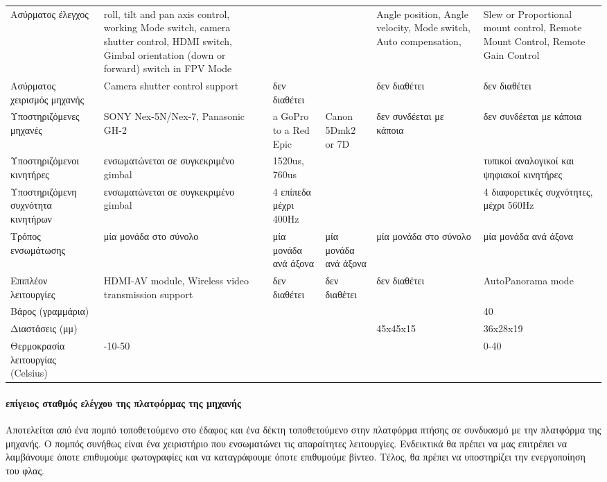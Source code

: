 \documentclass[a4paper, 12pt, twoside]{report}
\begin{document}
{{{{{{\begin{landscape}
\begin{longtable} { m{3cm} m{3cm} m{3cm} m{3cm} m{3cm} m{3cm} }
					\hdashline
					Ασύρματος έλεγχος & roll, tilt and pan axis control, working Mode switch, camera shutter control, HDMI switch, Gimbal orientation (down or forward) switch in FPV Mode & & & Angle position, Angle velocity, Mode switch, Auto compensation, & Slew or Proportional mount control, Remote Mount Control, Remote Gain Control\\
					\hdashline
					Ασύρματος χειρισμός μηχανής & Camera shutter control support & δεν διαθέτει & & δεν διαθέτει & δεν διαθέτει\\
					\hdashline
					Υποστηριζόμενες μηχανές & SONY Nex-5N/Nex-7, Panasonic GH-2 & a GoPro to a Red Epic & Canon 5Dmk2 or 7D & δεν συνδέεται με κάποια & δεν συνδέεται με κάποια\\
					\hdashline
					Υποστηριζόμενοι κινητήρες & ενσωματώνεται σε συγκεκριμένο gimbal & 1520us, 760us & & & τυπικοί αναλογικοί και ψηφιακοί κινητήρες\\
					Υποστηριζόμενη συχνότητα κινητήρων  & ενσωματώνεται σε συγκεκριμένο gimbal & 4 επίπεδα μέχρι 400Hz & & & 4 διαφορετικές συχνότητες, μέχρι 560Hz\\
					\hdashline
					Τρόπος ενσωμάτωσης & μία μονάδα στο σύνολο & μία μονάδα ανά άξονα & μία μονάδα ανά άξονα & μία μονάδα στο σύνολο & μία μονάδα ανά άξονα\\
					\hdashline
					Επιπλέον λειτουργίες & HDMI-AV module, Wireless video transmission support & δεν διαθέτει & δεν διαθέτει & δεν διαθέτει & AutoPanorama mode \\
					\hdashline
					Βάρος (γραμμάρια) & & & & & 40\\
					\hdashline
					Διαστάσεις (μμ) & & & & 45x45x15 & 36x28x19\\
					\hdashline
					Θερμοκρασία λειτουργίας (Celsius) & -10-50 & & & & 0-40\\
					\hline
				\end{longtable}
				\end{landscape}
			
			\paragraph{επίγειος σταθμός ελέγχου της πλατφόρμας της μηχανής}{Αποτελείται από ένα πομπό τοποθετούμενο στο έδαφος και ένα δέκτη τοποθετούμενο στην πλατφόρμα πτήσης σε συνδυασμό με την πλατφόρμα της μηχανής. Ο πομπός συνήθως είναι ένα χειριστήριο που ενσωματώνει τις απαραίτητες λειτουργίες. Ενδεικτικά θα πρέπει να μας επιτρέπει να λαμβάνουμε όποτε επιθυμούμε φωτογραφίες και να καταγράφουμε όποτε επιθυμούμε βίντεο. Τέλος, θα πρέπει να υποστηρίζει την ενεργοποίηση του φλας.
			}
}}}}}}
\end{document}
